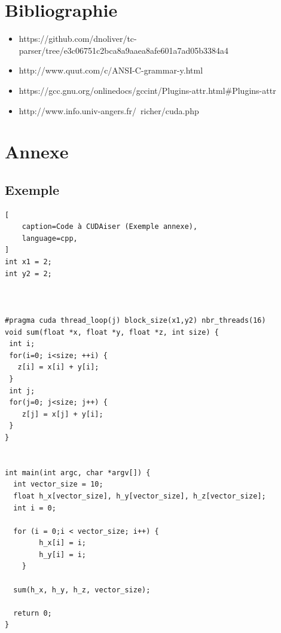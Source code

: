 \documentclass{article}
\begin{document}
\lstlistoflistings



\section*{Bibliographie}
\begin{itemize}

\item https://github.com/dnoliver/tc-parser/tree/e3c06751c2bca8a9aaea8afe601a7ad05b3384a4
\item http://www.quut.com/c/ANSI-C-grammar-y.html
\item https://gcc.gnu.org/onlinedocs/gccint/Plugins-attr.html\#Plugins-attr
\item http://www.info.univ-angers.fr/~richer/cuda.php

\end{itemize}
	

\newpage
	\section{Annexe}

	\subsection{Exemple}

	\begin{lstlisting}[
	caption=Code à CUDAiser (Exemple annexe),
    language=cpp,
]
int x1 = 2;
int y2 = 2;



#pragma cuda thread_loop(j) block_size(x1,y2) nbr_threads(16)
void sum(float *x, float *y, float *z, int size) {
 int i;
 for(i=0; i<size; ++i) {
   z[i] = x[i] + y[i];
 }
 int j;
 for(j=0; j<size; j++) {
    z[j] = x[j] + y[i];
 }
}


int main(int argc, char *argv[]) {
  int vector_size = 10;
  float h_x[vector_size], h_y[vector_size], h_z[vector_size];
  int i = 0;

  for (i = 0;i < vector_size; i++) {
		h_x[i] = i;
		h_y[i] = i;
	}

  sum(h_x, h_y, h_z, vector_size);

  return 0;
}
\end{lstlisting}
\end{document}
